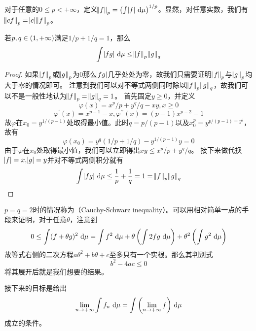 \documentclass[../main.tex]{subfiles}
\begin{document}
对于任意的\(0\leq p<+\infty\)，定义\(\enVert{f}_p=\del{\int\envert{f}\,\dif\mu}^{1/p}\)。显然，对任意实数，我们有\(\enVert{cf}_p=\envert{c}\enVert{f}_p\)。
\begin{theorem}
	\label{thm:1.5.2}
	若\(p,q\in\intoo{1,+\infty}\)满足\(1/p+1/q=1\)，那么
	\[\int\envert{fg}\,\dif\mu\leq\enVert{f}_p\enVert{g}_q\]
\end{theorem}
\begin{proof}
	如果\(\enVert{f}_p\)或\(\enVert{g}_p\)为\(0\)那么\(\envert{fg}\)几乎处处为零，故我们只需要证明\(\enVert{f}_p\)与\(\enVert{g}_p\)均大于零的情况即可。
	注意到我们可以对不等式两侧同时除以\(\enVert{f}_p\enVert{g}_q\)，故我们可以不是一般性地认为\(\enVert{f}_p=\enVert{g}_q=1\)。
	首先固定\(y\geq0\)，并定义
	\[\varphi(x)=x^p/p+y^q/q-xy, x\geq0\]
	\[\varphi^\prime(x)=x^{p-1}-x, \varphi^{\prime\prime}(x)=(p-1)x^{p-2}-1\]
	故\(\varphi\)在\(x_0=y^{1/(p-1)}\)处取得最小值。此时\(q=p/(p-1)\)以及\(x_0^p=y^{p/(p-1)=y^q}\)，故有
	\[\varphi(x_0)=y^q(1/p+1/q)-y^{1/(p-1)}y=0\]
	由于\(\varphi\)在\(x_0\)处取得最小值，我们可以立即得出\(xy\leq x^p/p+y^q/q\)。
	接下来做代换\(\envert{f}=x,\envert{g}=y\)并对不等式两侧积分就有
	\[\int\envert{fg}\,\dif\mu\leq\frac{1}{p}+\frac{1}{q}=1=\enVert{f}_p\enVert{g}_q\]
\end{proof}
\begin{remark}
	\(p=q=2\)时的情况称为（Cauchy-Schwarz inequality）。可以用相对简单一点的手段来证明，对于任意\(\theta\)，注意到
	\[0\leq\int(f+\theta g)^2\,\dif\mu=\int f^2\,\dif\mu+\theta\del{\int 2fg\,\dif\mu}+\theta^2\del{\int g^2\,\dif\mu}\]
	故等式右侧的二次方程\(a\theta^2+b\theta+c\)至多只有一个实根。那么其判别式
	\[b^2-4ac\leq0\]
	将其展开后就是我们想要的结果。
\end{remark}

接下来的目标是给出
\[\lim\limits_{n\rightarrow+\infty}\int f_n\,\dif\mu=\int\del{\lim\limits_{n\rightarrow+\infty}f}\,\dif\mu\]
成立的条件。
\end{document}
